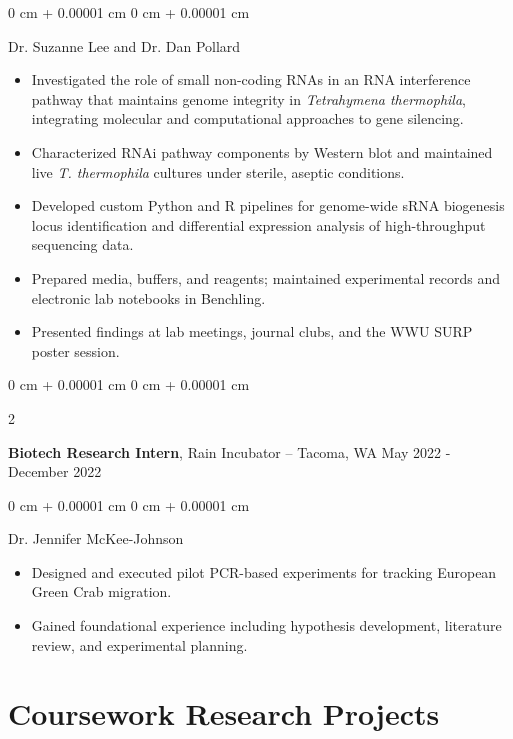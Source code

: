 \documentclass[10pt, article]{article}
\newenvironment{highlights}{
    \begin{itemize}[
        topsep=0.10 cm,
        parsep=0.10 cm,
        partopsep=0pt,
        itemsep=0pt,
        leftmargin=0 cm + 10pt
    ]
}{
    \end{itemize}
} %
\newenvironment{onecolentry}{
    \begin{adjustwidth}{
        0 cm + 0.00001 cm
    }{
        0 cm + 0.00001 cm
    }
}{
    \end{adjustwidth}
} %
\newenvironment{twocolentry}[2][]{
    \onecolentry
    \def\secondColumn{#2}
    \setcolumnwidth{\fill, 4.5 cm}
    \begin{paracol}{2}
}{
    \switchcolumn \raggedleft \secondColumn
    \end{paracol}
    \endonecolentry
} %
\begin{document}
\begin{onecolentry}
	Dr. Suzanne Lee and Dr. Dan Pollard
	\begin{highlights}
		\item Investigated the role of small non-coding RNAs in an RNA interference pathway that maintains genome integrity in \textit{Tetrahymena thermophila}, integrating molecular and computational approaches to gene silencing.
		\item Characterized RNAi pathway components by Western blot and maintained live \textit{T. thermophila} cultures under sterile, aseptic conditions.
		\item Developed custom Python and R pipelines for genome-wide sRNA biogenesis locus identification and differential expression analysis of high-throughput sequencing data.
		\item Prepared media, buffers, and reagents; maintained experimental records and electronic lab notebooks in Benchling.
		\item Presented findings at lab meetings, journal clubs, and the WWU SURP poster session.
	\end{highlights}
\end{onecolentry}

\vspace{0.2 cm}

\begin{samepage}
\begin{twocolentry}{
		May 2022 - December 2022
	}
	\textbf{Biotech Research Intern}, Rain Incubator -- Tacoma, WA\end{twocolentry}
\begin{onecolentry}
	Dr. Jennifer McKee-Johnson
	\begin{highlights}
		\item Designed and executed pilot PCR-based experiments for tracking European Green Crab migration.
		\item Gained foundational experience including hypothesis development, literature review, and experimental planning.
	\end{highlights}
\end{onecolentry}
\end{samepage}

\vspace{0.2 cm}

\section{Coursework Research Projects}
\end{document}
